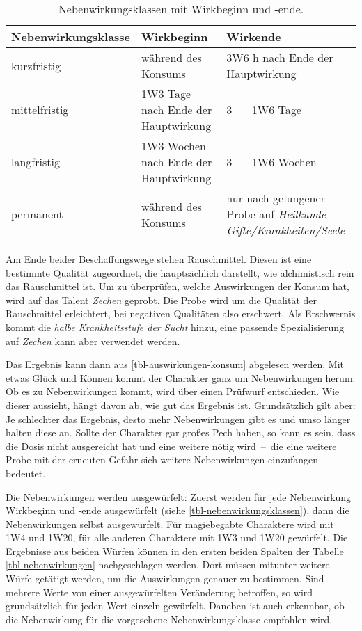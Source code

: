 {
\begin{table}
	\centering
	\caption[Nebenwirkungsklassen]{Nebenwirkungsklassen mit Wirkbeginn und -ende.\label{tbl-nebenwirkungsklassen}}
	\begin{tabularx}{\textwidth}{p{3.25cm}p{6.75cm}p{5.7cm}}
		\toprule
		Nebenwirkungsklasse & Wirkbeginn & Wirkende \\
		\hline
		kurzfristig & während des Konsums & 3W6 h nach Ende der Hauptwirkung \\
		mittelfristig & 1W3 Tage nach Ende der Hauptwirkung & 3~+~1W6 Tage \\
		langfristig & 1W3 Wochen nach Ende der Hauptwirkung & 3~+~1W6 Wochen \\
		permanent & während des Konsums & nur nach gelungener Probe auf \emph{Heilkunde Gifte/Krankheiten/Seele} \\
		\bottomrule
	\end{tabularx}
\end{table}
}
Am Ende beider Beschaffungswege stehen Rauschmittel. Diesen ist eine bestimmte Qualität zugeordnet, die hauptsächlich darstellt, wie alchimistisch rein das Rauschmittel ist. Um zu überprüfen, welche Auswirkungen der Konsum hat, wird auf das Talent \emph{Zechen} geprobt. Die Probe wird um die Qualität der Rauschmittel erleichtert, bei negativen Qualitäten also erschwert. Als Erschwernis kommt die \emph{halbe Krankheitsstufe der Sucht} hinzu, eine passende Spezialisierung auf \emph{Zechen} kann aber verwendet werden.

Das Ergebnis kann dann aus \vref{tbl-auswirkungen-konsum} abgelesen werden. Mit etwas Glück und Können kommt der Charakter ganz um Nebenwirkungen herum. Ob es zu Nebenwirkungen kommt, wird über einen Prüfwurf entschieden. Wie dieser aussieht, hängt davon ab, wie gut das Ergebnis ist. Grundsätzlich gilt aber: Je schlechter das Ergebnis, desto mehr Nebenwirkungen gibt es und umso länger halten diese an. Sollte der Charakter gar großes Pech haben, so kann es sein, dass die Dosis nicht ausgereicht hat und eine weitere nötig wird~--~die eine weitere Probe mit der erneuten Gefahr sich weitere Nebenwirkungen einzufangen bedeutet.

Die Nebenwirkungen werden ausgewürfelt: Zuerst werden für jede Nebenwirkung Wirkbeginn und -ende ausgewürfelt (siehe \vref{tbl-nebenwirkungsklassen}), dann die Nebenwirkungen selbst ausgewürfelt. Für magiebegabte Charaktere wird mit 1W4 und 1W20, für alle anderen Charaktere mit 1W3 und 1W20 gewürfelt. Die Ergebnisse aus beiden Würfen können in den ersten beiden Spalten der Tabelle \vref{tbl-nebenwirkungen} nachgeschlagen werden. Dort müssen mitunter weitere Würfe getätigt werden, um die Auswirkungen genauer zu bestimmen. Sind mehrere Werte von einer ausgewürfelten Veränderung betroffen, so wird grundsätzlich für jeden Wert einzeln gewürfelt. Daneben ist auch erkennbar, ob die Nebenwirkung für die vorgesehene Nebenwirkungsklasse empfohlen wird.

